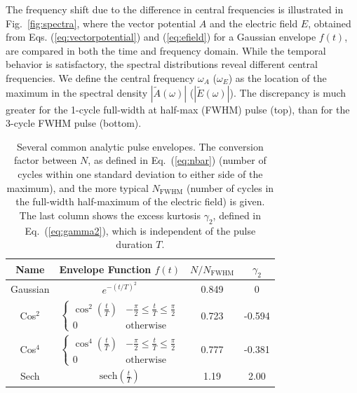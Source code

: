The frequency shift due to the difference in central frequencies is illustrated in Fig.~\ref{fig:spectra}, where the vector potential $A$ and the electric field $E$, obtained from Eqs. (\ref{eq:vectorpotential}) and (\ref{eq:efield}) for a Gaussian envelope $f(t)$, are compared in both the time and frequency domain. While the temporal behavior is satisfactory, the spectral distributions reveal different central frequencies. We define the central frequency $\omega_A$ ($\omega_E$) as the location of the maximum in the spectral density $|\tilde{A}(\omega)|$ ($|\tilde{E}(\omega)|$). The discrepancy is much greater for the 1-cycle full-width at half-max (FWHM) pulse (top), than for the 3-cycle FWHM pulse (bottom).

\begin{table}
\begin{center}
 \begin{tabular}{||c | c | c | c||} 
 \hline
 Name & Envelope Function $f(t)$ & $ N/N_{\text{FWHM}}$ & $\gamma_2$ \\ [0.5ex] 
 \hline\hline
 Gaussian & $e^{-(t/T)^2}$ & 0.849 & 0 \\ 
 \hline
 Cos$^2$ & $\begin{cases} 
      \cos^2\left(\frac{t}{T}\right) & -\frac{\pi}{2} \leq \frac{t}{T} \leq \frac{\pi}{2} \\
      0 & \text{otherwise}
    \end{cases}$ & 0.723 & -0.594 \\
 \hline
  Cos$^4$ &  $\begin{cases} 
        \cos^4\left(\frac{t}{T}\right) & -\frac{\pi}{2} \leq \frac{t}{T} \leq \frac{\pi}{2} \\
        0 & \text{otherwise}
    \end{cases}$ & 0.777 & -0.381 \\
 \hline
 Sech & $\text{sech}(\frac{t}{T})$ & 1.19 & 2.00 \\
 \hline
\end{tabular}
\end{center}
 \caption{Several common analytic pulse envelopes. The conversion factor between $N$, as defined in Eq.~(\ref{eq:nbar}) (number of cycles within one standard deviation to either side of the maximum), and the more typical $N_{\text{FWHM}}$ (number of cycles in the full-width half-maximum of the electric field) is given. The last column shows the excess kurtosis $\gamma_2$, defined in Eq.~(\ref{eq:gamma2}), which is independent of the pulse duration $T$.}
 \label{tab:envelopes}
\end{table}

